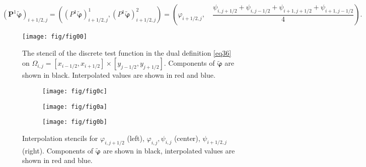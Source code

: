 \documentclass[reqno,a4paper,12pt]{amsart}
\begin{document}
\begin{equation}
      (\bm{P}^1 \widetilde{\bm{\varphi}})_{i+1/2,j} = \left((P^1 \widetilde{\bm{\varphi}})^1_{i+1/2,j}, (P^1 \widetilde{\bm{\varphi}})^2_{i+1/2,j} \right) = \left( \varphi_{i+1/2,j}, \quad \frac{\psi_{i,j+1/2}+\psi_{i,j-1/2}+\psi_{i+1,j+1/2}+\psi_{i+1,j-1/2}}{4} \right). \label{eq33} 
\end{equation}

\begin{figure}[htb!]
         \centering
         \texttt{[image: fig/fig00]}
     \hfill
    
        \caption{The stencil of the discrete test function in the dual definition \eqref{eq36} on \newline $\Omega_{i,j} =  [x_{i-1/2},x_{i+1/2}] \times [y_{j-1/2},y_{j+1/2}]$. Components of $\widetilde{\bm{\varphi}}$ are shown in black. Interpolated values are shown in red and blue.}
        \label{fig:00}
\end{figure}
\begin{figure}[htb!]
\centering
     \begin{subfigure}[b]{0.25\textwidth}
         \centering
         \texttt{[image: fig/fig0c]}
     \end{subfigure}
     \begin{subfigure}[b]{0.25\textwidth}
         \centering
         \texttt{[image: fig/fig0a]}
     \end{subfigure}
          \begin{subfigure}[b]{0.345\textwidth}
         \centering
         \texttt{[image: fig/fig0b]}
     \end{subfigure}
     \hfill
    
        \caption{Interpolation stencils for $\varphi_{i,j+1/2}$ (left), $\varphi_{i,j}, \psi_{i,j}$ (center), $\psi_{i+1/2,j}$ (right). Components of $\widetilde{\bm{\varphi}}$ are shown in black, interpolated values are shown in red and blue.}
        \label{fig:0}
\end{figure}
\end{document}
